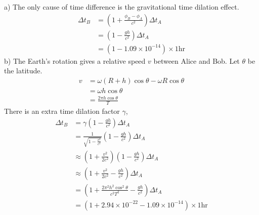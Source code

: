 \documentclass[12pt]{book} %
\numberwithin{equation}{chapter}
\def\c{\gamma}
\def\D{\Delta}
\def\w{\omega}
\begin{document}
\begin{solbox}
a) The only cause of time difference is the gravitational time dilation effect.
\begin{align*}
\D t_{B}&=\left(1+\frac{\phi_{B}-\phi_{A}}{c^2}\right)\D t_{A}\\
&=\left(1-\frac{gh}{c^2}\right)\D t_{A}\\
&=\left(1-1.09\times10^{-14}\right)\times 1\text{hr}
\end{align*}
b) The Earth's rotation gives a relative speed $v$ between Alice and Bob. Let $\theta$ be the latitude.
\begin{align*}
v&=\w(R+h)\cos\theta-\w R\cos\theta\\
&=\w h\cos\theta\\
&=\frac{2\pi h\cos\theta}{T}
\end{align*}
There is an extra time dilation factor $\c$,
\begin{align*}
\D t_{B}&=\c \left(1-\frac{gh}{c^2}\right)\D t_{A}\\
&=\frac{1}{\sqrt{1-\frac{v^2}{c^2}}}\left(1-\frac{gh}{c^2}\right)\D t_{A}\\
&\approx \left(1+\frac{v^2}{2c^2}\right)\left(1-\frac{gh}{c^2}\right)\D t_{A}\\
&\approx \left(1+\frac{v^2}{2c^2}-\frac{gh}{c^2}\right)\D t_{A}\\
&=\left(1+\frac{2\pi^{2}h^{2}\cos^{2}\theta}{c^2 T^2}-\frac{gh}{c^2}\right)\D t_{A}\\
&=\left(1+2.94\times 10^{-22}-1.09\times 10^{-14}\right)\times 1\text{hr}
\end{align*}
\end{solbox}
\end{document}
